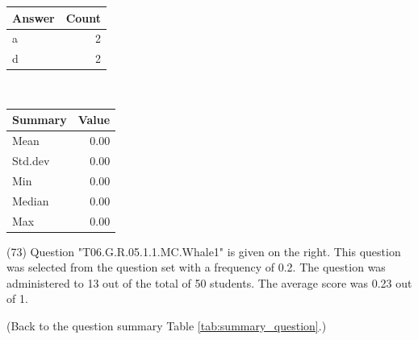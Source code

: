 \documentclass[12pt,english,nohyper]{tufte-handout}\usepackage[]{graphicx}\usepackage[]{color}
\begin{document}
\begin{center}%
\begin{tabular}{lr}
  \hline
Answer & Count \\ 
  \hline
a &   2 \\ 
  d &   2 \\ 
   \hline
\end{tabular}
~~~~~~~~%
\begin{tabular}{lr}
  \hline
Summary & Value \\ 
  \hline
Mean & 0.00 \\ 
  Std.dev & 0.00 \\ 
  Min & 0.00 \\ 
  Median & 0.00 \\ 
  Max & 0.00 \\ 
   \hline
\end{tabular}
\end{center}\newpage{} (73) Question "T06.G.R.05.1.1.MC.Whale1" is given on the right. This question was selected from the question set with a frequency of 0.2. The question was administered to 13 out of the total of 50 students. The average score was 0.23 out of 1.

 (Back to the question summary Table \ref{tab:summary_question}.)
\end{document}

